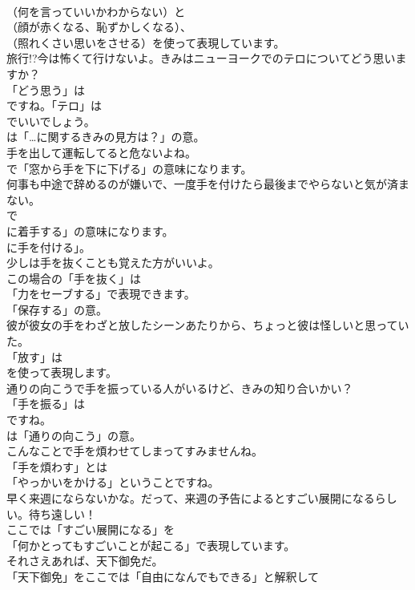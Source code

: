 \documentclass[8pt]{extreport}
\begin{document}
\begin{CJK}{UTF8}{min}
\\	（何を言っていいかわからない）と
\\	（顔が赤くなる、恥ずかしくなる）、
\\	（照れくさい思いをさせる）を使って表現しています。	
\\	旅行!?今は怖くて行けないよ。きみはニューヨークでのテロについてどう思いますか？ 
\\	「どう思う」は 
\\	ですね。「テロ」は 
\\	でいいでしょう。
\\	は「…に関するきみの見方は？」の意。	
\\	手を出して運転してると危ないよね。 
\\	で「窓から手を下に下げる」の意味になります。	
\\	何事も中途で辞めるのが嫌いで、一度手を付けたら最後までやらないと気が済まない。 
\\	で
\\	に着手する」の意味になります。
\\	に手を付ける」。	
\\	少しは手を抜くことも覚えた方がいいよ。 
\\	この場合の「手を抜く」は
\\	「力をセーブする」で表現できます。
\\	「保存する」の意。	
\\	彼が彼女の手をわざと放したシーンあたりから、ちょっと彼は怪しいと思っていた。 
\\	「放す」は
\\	を使って表現します。	
\\	通りの向こうで手を振っている人がいるけど、きみの知り合いかい？ 
\\	「手を振る」は 
\\	ですね。
\\	は「通りの向こう」の意。	
\\	こんなことで手を煩わせてしまってすみませんね。 
\\	「手を煩わす」とは
\\	「やっかいをかける」ということですね。	
\\	早く来週にならないかな。だって、来週の予告によるとすごい展開になるらしい。待ち遠しい！ 
\\	ここでは「すごい展開になる」を
\\	「何かとってもすごいことが起こる」で表現しています。	
\\	それさえあれば、天下御免だ。 
\\	「天下御免」をここでは「自由になんでもできる」と解釈して

\end{CJK}
\end{document}
